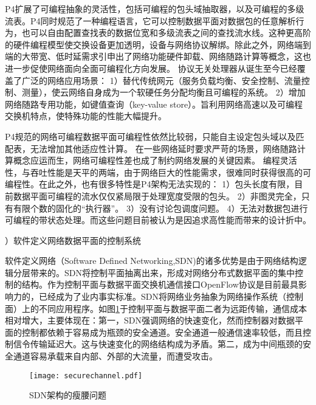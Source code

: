 P4扩展了可编程抽象的灵活性，包括可编程的包头域抽取器，以及可编程的多级流表。P4同时规范了一种编程语言，它可以控制数据平面对数据包的任意解析行为，也可以自由配置查找表的数据位宽和多级流表之间的查找流水线。这种更高阶的硬件编程模型使交换设备更加透明，设备与网络协议解绑。除此之外，网络端到端的大带宽、低时延需求引申出了网络功能硬件卸载、网络随路计算等概念，这也进一步促使网络面向全面可编程化方向发展。
协议无关处理器从诞生至今已经覆盖了广泛的网络应用场景：
1）替代传统网元（服务负载均衡、安全控制、流量控制、测量），使云网络自身成为一个软硬任务分配均衡且可编程的系统。
2）增加网络随路专用功能，如键值查询（key-value store）。旨利用网络高速以及可编程交换机特点，使特殊功能的性能大幅提升。

P4规范的网络可编程数据平面可编程性依然比较弱，只能自主设定包头域以及匹配表，无法增加其他适应性计算。
在一些网络延时要求严苛的场景，网络随路计算概念应运而生，网络可编程性差也成了制约网络发展的关键因素。
编程灵活性，与吞吐性能是天平的两端，由于网络巨大的性能需求，很难同时获得很高的可编程性。在此之外，也有很多特性是P4架构无法实现的：
1）包头长度有限，目前数据平面可编程的流水仅仅紧局限于处理宽度受限的包头。
2）非图灵完全，只有有限个数的固化的“执行器”。
3）没有讨论包调度问题。
4）无法对数据包进行可编程的带状态处理。而这些问题目前被认为是因追求高性能而带来的设计折中。






\label{chap121}

{）软件定义网络数据平面的控制系统}


软件定义网络（Software Defined Networking,SDN)的诸多优势是由于网络结构逻辑分层带来的。SDN将控制平面抽离出来，形成对网络分布式数据平面的集中控制的结构。作为控制平面与数据平面交换机通信接口OpenFlow协议是目前最具影响力的，已经成为了业内事实标准。SDN将网络业务抽象为网络操作系统（控制面）上的不同应用程序。如图\ref{fig:securechannel}于控制平面与数据平面二者为远距传输，通信成本相对增大，主要体现在：第一，SDN强调网络的快速变化，然而控制器对数据平面的控制都依赖于容易成为瓶颈的安全通道。安全通道一般通信速率较低，而且控制信令传输延迟大。这与快速变化的网络结构成为矛盾。第二，成为中间瓶颈的安全通道容易承载来自内部、外部的大流量，而遭受攻击。

\begin{figure}[!ht]
	\centering 
	\vspace{-1.5mm}
	\texttt{[image: securechannel.pdf]}
	\caption{SDN架构的瘦腰问题} \label{fig:securechannel}
\end{figure}

